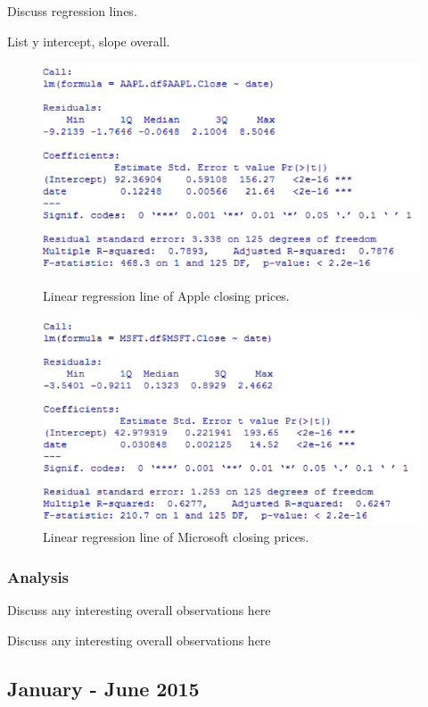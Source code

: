 \documentclass[paper=a4, fontsize=11pt]{scrartcl} %
\numberwithin{equation}{section} %
\numberwithin{figure}{section} %
\numberwithin{table}{section} %
\begin{document}
Discuss regression lines. 

List y intercept, slope overall. 

\begin{figure}[!htb]
  \includegraphics[width=\linewidth]{graph/aapl_reg_8.png}
  \caption{Linear regression line of Apple closing prices.}
\endminipage\hfill
{}
  \includegraphics[width=\linewidth]{graph/msft_reg_8.png}
  \caption{Linear regression line of Microsoft closing prices.}
\endminipage\hfill
\end{figure}


\subsubsection{Analysis}
Discuss any interesting overall observations here

Discuss any interesting overall observations here

\subsection{January - June  2015 }
\end{document}
